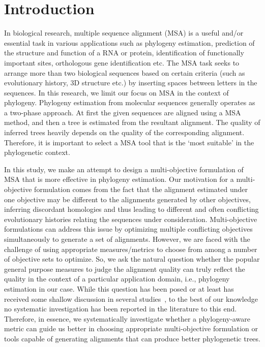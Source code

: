 \section{Introduction}
\label{sec:introducntion}
In biological research, multiple sequence alignment (MSA) is a useful and/or essential task in various applications such as phylogeny estimation, prediction of the structure and function of a RNA or protein, identification of functionally important sites, orthologous gene identification etc. The MSA task seeks to arrange more than two biological sequences based on certain criteria (such as evolutionary history, 3D structure etc.) by inserting spaces between letters in the sequences.  In this research, we limit our focus on MSA in the context of phylogeny. Phylogeny estimation from molecular sequences generally operates as a two-phase approach. At first the given sequences are aligned using a MSA method, and then a tree is estimated from the resultant alignment. The quality of inferred trees heavily depends on the quality of the corresponding alignment. Therefore, it is important to select a MSA tool that is the `most suitable' in the phylogenetic context.

In this study, we make an attempt to design a multi-objective formulation of MSA that is more effective in phylogeny estimation. Our motivation for a multi-objective formulation comes from the fact that the alignment estimated under one objective may be different to the alignments generated by other objectives, inferring discordant homologies and thus leading to different and often conflicting evolutionary histories relating the sequences under consideration. Multi-objective formulations can address this issue by optimizing multiple conflicting objectives simultaneously to generate a set of alignments. However, we are faced with the challenge of using appropriate measures/metrics to choose from among a number of objective sets to optimize. So, we ask the natural question whether the popular general purpose measures to judge the alignment quality can truly reflect the quality in the context of a particular application domain, i.e., phylogeny estimation in our case. While this question has been posed or at least has received some shallow discussion in several studies~\citep{warnow2013large, mirarab2015pasta, liu2009rapid}, to the best of our knowledge no systematic investigation has been reported in the literature to this end. Therefore, in essence, we systematically investigate whether a phylogeny-aware metric can guide us better in choosing appropriate multi-objective formulation or tools capable of generating alignments that can produce better phylogenetic trees.


